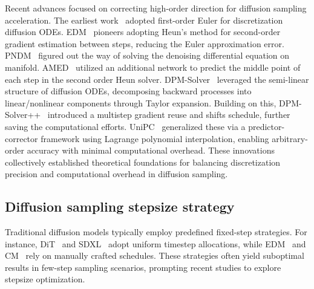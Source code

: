 \documentclass[10pt,twocolumn,letterpaper]{article}
\begin{document}
    
    Recent advances focused on correcting high-order direction for diffusion sampling acceleration. The earliest work~\cite{ddim} adopted first-order Euler for discretization diffusion ODEs.  EDM~\cite{edm} pioneers adopting Heun's\cite{heun} method for second-order gradient estimation between steps, reducing the Euler approximation error. PNDM~\cite{liu2022pseudo} figured out the way of solving the denoising differential equation on manifold. AMED~\cite{zhou2024fast} utilized an additional network to predict the middle point of each step in the second order Heun solver. DPM-Solver~\cite{dpm} leveraged the semi-linear structure of diffusion ODEs, decomposing backward processes into linear/nonlinear components through Taylor expansion. Building on this, DPM-Solver++~\cite{dpm++} introduced a multistep gradient reuse and shifts schedule, further saving the computational efforts. UniPC~\cite{unipc} generalized these via a predictor-corrector framework using Lagrange polynomial interpolation, enabling arbitrary-order accuracy with minimal computational overhead. These innovations collectively established theoretical foundations for balancing discretization precision and computational overhead in diffusion sampling.

    \subsection{Diffusion sampling stepsize strategy}
    Traditional diffusion models typically employ predefined fixed-step strategies. For instance, DiT~\cite{dit} and SDXL~\cite{sdxl} adopt uniform timestep allocations, while EDM~\cite{edm} and CM~\cite{cm} rely on manually crafted schedules. These strategies often yield suboptimal results in few-step sampling scenarios, prompting recent studies to explore stepsize optimization.
\end{document}
